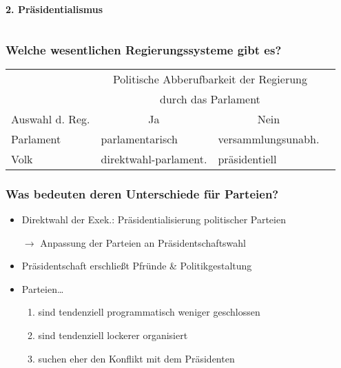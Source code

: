 \documentclass{beamer}
\begin{document}
\begin{frame}
\begin{columns}
\begin{column}{.5\textwidth}
\begin{block}{\textbf{2. Präsidentialismus}}
\end{block}
\end{column}
\end{columns}
\end{frame}

\begin{frame}
\frametitle{Welche wesentlichen Regierungssysteme gibt es?}
\begin{table}
  \centering
  \begin{tabular}{*{4}{l}}
     ~ & \multicolumn{2}{c}{Politische Abberufbarkeit der Regierung} \\
     ~ & \multicolumn{2}{c}{durch das Parlament} \\
    Auswahl d. Reg. & \multicolumn{1}{c}{Ja} & \multicolumn{1}{c}{Nein} \\
    \cmidrule{2-3}
    Parlament & parlamentarisch & versammlungsunabh.\\
    Volk & direktwahl-parlament. & präsidentiell\\
  \end{tabular}
\end{table}
\end{frame}

\begin{frame}
\frametitle{Was bedeuten deren Unterschiede für Parteien?}
\begin{itemize}
  \item Direktwahl der Exek.: Präsidentialisierung politischer Parteien
  \item [$\rightarrow$] Anpassung der Parteien an Präsidentschaftswahl
  \item Präsidentschaft erschließt Pfründe \& Politikgestaltung
  \item Parteien\dots
  \begin{enumerate}
    \item sind tendenziell programmatisch weniger geschlossen
    \item sind tendenziell lockerer organisiert
    \item suchen eher den Konflikt mit dem Präsidenten
  \end{enumerate}
\end{itemize}
\end{frame}
\end{document}
